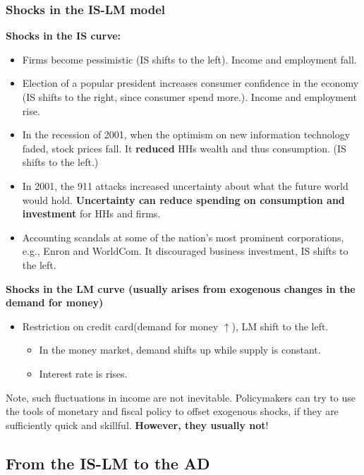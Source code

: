 \documentclass[10pt]{article}
\begin{document}
\subsubsection{Shocks in the IS-LM model}

{\textbf {Shocks in the IS curve:}}
\begin{itemize}
\item Firms become pessimistic (IS shifts to the left). Income and employment fall.
\item Election of a popular president increases consumer confidence in the economy
		(IS shifts to the right, since consumer spend more.). Income and employment rise.
\item In the recession of 2001, when the optimism on new information technology faded,
		stock prices fall. It {\textbf {reduced}} HHs wealth and thus consumption. (IS
		shifts to the left.)
\item In 2001, the 911 attacks increased uncertainty about what the future world would
		hold. {\textbf {Uncertainty can reduce spending on consumption and investment}} for
		HHs and firms.
\item Accounting scandals at some of the nation's most prominent corporations, e.g.,
		Enron and WorldCom. It discouraged business investment, IS shifts to the left.
\end{itemize}


{\textbf {Shocks in the LM curve (usually arises from exogenous changes in the demand
for money)}}
\begin{itemize}
\item Restriction on credit card(demand for money $ \uparrow $), LM shift to the left.
		\begin{itemize}
		\item In the money market, demand shifts up while supply is constant.
		\item Interest rate is rises.
		\end{itemize}
\end{itemize}




Note, such fluctuations in income are not inevitable. Policymakers can try to use the
tools of monetary and fiscal policy to offset exogenous shocks, if they are sufficiently
quick and skillful. {\textbf {However, they usually not}}!







\subsection{From the IS-LM to the AD}
\end{document}
